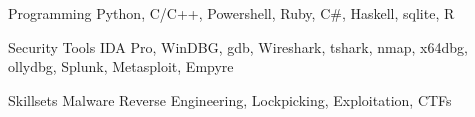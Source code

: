


\begin{cvskills}


\cvskill
{Programming} %
{Python, C/C++, Powershell, Ruby, C\#, Haskell, sqlite, R} %


\cvskill
{Security Tools} %
{IDA Pro, WinDBG, gdb, Wireshark, tshark, nmap, x64dbg, ollydbg, Splunk, Metasploit, Empyre} %


\cvskill
{Skillsets} %
{Malware Reverse Engineering, Lockpicking, Exploitation, CTFs} %


\end{cvskills}